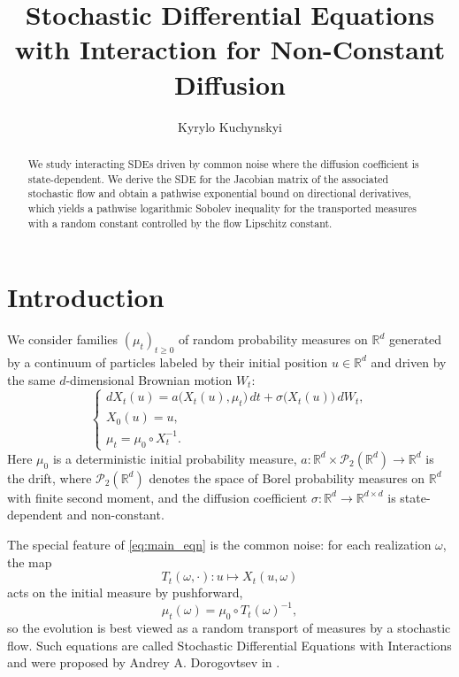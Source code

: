 \documentclass{tsp-short}
\title[Interacting SDEs]{Stochastic Differential Equations with Interaction for Non-Constant Diffusion}
\author{Kyrylo Kuchynskyi}
\theoremstyle{remark}
\theoremstyle{definition}
\begin{document}
\begin{abstract}
We study interacting SDEs driven by common noise where the diffusion coefficient is state-dependent.
We derive the SDE for the Jacobian matrix of the associated stochastic flow and obtain a pathwise exponential bound on directional derivatives, which yields a pathwise logarithmic Sobolev inequality for the transported measures with a random constant controlled by the flow Lipschitz constant.
\end{abstract}

\maketitle







\section{Introduction}\label{sec:intro}

We consider families $(\mu_t)_{t\ge 0}$ of random probability measures on $\mathbb{R}^d$ generated by a continuum of particles labeled by their initial position $u\in\mathbb{R}^d$ and driven by the same $d$-dimensional Brownian motion $W_t$:
\begin{equation}
\begin{cases}
dX_t(u) = a\big(X_t(u),\mu_t\big)\,dt + \sigma\big(X_t(u)\big)\,dW_t,\\[2mm]
X_0(u)=u,\\[1mm]
\mu_t = \mu_0\circ X_t^{-1}.
\end{cases}
\label{eq:main_eqn}
\end{equation}
Here $\mu_0$ is a deterministic initial probability measure, 
$a:\mathbb{R}^d\times\mathcal{P}_2(\mathbb{R}^d)\to\mathbb{R}^d$ is the drift, where 
$\mathcal{P}_2(\mathbb{R}^d)$ denotes the space of Borel probability measures on $\mathbb{R}^d$ with finite second moment, 
and the diffusion coefficient $\sigma:\mathbb{R}^d\to\mathbb{R}^{d\times d}$ is state-dependent and non-constant.



The special feature of \eqref{eq:main_eqn} is the common noise: for each realization $\omega$, the map
\begin{equation*}
T_t(\omega,\cdot):u\mapsto X_t(u,\omega)
\end{equation*}
acts on the initial measure by pushforward,
\begin{equation*}
\mu_t(\omega)=\mu_0\circ T_t(\omega)^{-1},
\end{equation*}
so the evolution is best viewed as a random transport of measures by a stochastic flow.  Such equations are called Stochastic Differential Equations with Interactions and were proposed by Andrey A. Dorogovtsev in \cite{dorogovtsev2003}. 
\end{document}
